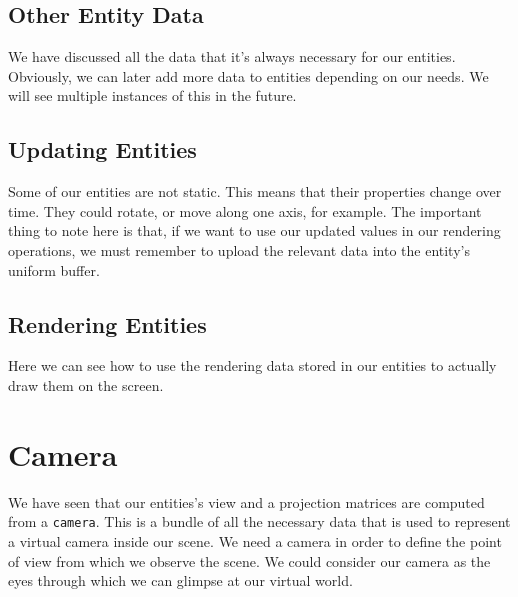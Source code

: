\subsection{Other Entity Data}

We have discussed all the data that it's always necessary for our entities.
Obviously, we can later add more data to entities depending on our needs.
We will see multiple instances of this in the future.

\subsection{Updating Entities}

Some of our entities are not static.
This means that their properties change over time.
They could rotate, or move along one axis, for example.
The important thing to note here is that, if we want to use
our updated values in our rendering operations, we must remember
to upload the relevant data into the entity's uniform buffer.

\begin{minipage}{\linewidth}{\noindent}
    
\end{minipage}

\subsection{Rendering Entities}

Here we can see how to use the rendering data stored in our entities
to actually draw them on the screen.

\begin{minipage}{\linewidth}{\noindent}
    
\end{minipage}

\section{Camera}

We have seen that our entities's view and a projection matrices are computed
from a \texttt{camera}.
This is a bundle of all the necessary data that is used to represent a virtual
camera inside our scene.
We need a camera in order to define the point of view from which we observe
the scene.
We could consider our camera as the eyes through which we can glimpse at
our virtual world.

